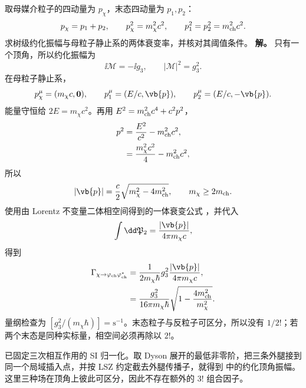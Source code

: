 \begin{exbox}
取母媒介粒子的四动量为 $p_\chi$，末态四动量为 $p_1,p_2$：
\begin{equation*}
 p_\chi=p_1+p_2,\qquad p_\chi^2=m_\chi^2c^2,\qquad p_1^2=p_2^2=m_{\rm ch}^2c^2.
\end{equation*}
求树级约化振幅与母粒子静止系的两体衰变率，并核对其阈值条件。
\textbf{解。} 只有一个顶角，所以约化振幅为
\begin{equation}
 \ii\mathcal M=-\ii g_3,
 \qquad |\mathcal M|^2=g_3^2.
 \label{eq:scalar-cubic-decay-mphi-r15}
\end{equation}
在母粒子静止系，
\begin{equation*}
 p_\chi^\mu=(m_\chi c,\mathbf0),\qquad
 p_1^\mu=(E/c,\vb{p}),\qquad
 p_2^\mu=(E/c,-\vb{p}).
\end{equation*}
能量守恒给 $2E=m_\chi c^2$。再用 $E^2=m_{\rm ch}^2c^4+c^2p^2$，
\begin{align*}
 p^2
 &=\frac{E^2}{c^2}-m_{\rm ch}^2c^2,\\
 &=\frac{m_\chi^2c^2}{4}-m_{\rm ch}^2c^2,
\end{align*}
所以
\begin{equation}
 {
 |\vb{p}|
 =\frac{c}{2}\sqrt{m_\chi^2-4m_{\rm ch}^2},
 \qquad m_\chi\ge 2m_{\rm ch}.}
 \label{eq:scalar-cubic-decay-p-r10}
\end{equation}
使用由 Lorentz 不变量二体相空间得到的一体衰变公式 ，并代入
\begin{equation*}
 \int\dd\mathfrak P_2
 =\frac{|\vb{p}|}{4\pi m_\chi c},
\end{equation*}
得到
\begin{align}
 \Gamma_{\chi\to\varphi_{\rm ch}\varphi_{\rm ch}^{\ast}}
 &=\frac{1}{2m_\chi\hbar}g_3^2
 \frac{|\vb{p}|}{4\pi m_\chi c},\\
 &={
 \frac{g_3^2}{16\pi m_\chi\hbar}
 \sqrt{1-\frac{4m_{\rm ch}^2}{m_\chi^2}}.}
 \label{eq:scalar-cubic-decay-width-r10}
\end{align}
量纲检查为 $[g_3^2/(m_\chi\hbar)]=\mathrm{s^{-1}}$。末态粒子与反粒子可区分，所以没有 $1/2!$；若两个末态是同种实标量，相空间必须再除以 $2!$。

\medskip

 已固定三次相互作用的 SI 归一化。取 Dyson 展开的最低非零阶，把三条外腿接到同一个局域插入点，并按 LSZ 约定截去外腿传播子，就得到 中的约化顶角振幅。这里三种场在顶角上彼此可区分，因此不存在额外的 $3!$ 组合因子。


\end{exbox}
